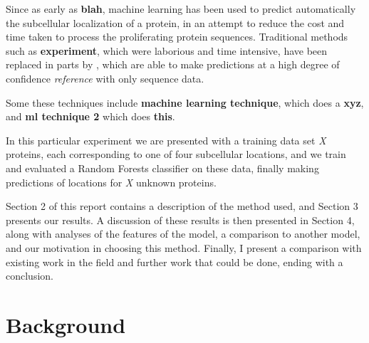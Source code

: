 \documentclass{bioinfo}
\begin{document}
Since as early as \textbf{blah}, machine learning has been used to predict automatically the subcellular localization of a protein, in an attempt to reduce the cost and time taken to process the proliferating protein sequences.   Traditional methods such as \textbf{experiment}, which were laborious and time intensive, have been replaced in parts by , which are able to make predictions at a high degree of confidence \textit{reference} with only sequence data.

Some these techniques include \textbf{machine learning technique}, which does a \textbf{xyz}, and \textbf{ml technique 2} which does \textbf{this}. 

In this particular experiment we are presented with a training data set \textit{X} proteins, each corresponding to one of four subcellular locations, and we train and evaluated a Random Forests classifier on these data, finally making predictions of locations for \textit{X} unknown proteins.  

Section 2 of this report contains a description of the method used, and Section 3 presents our results. A discussion of these results is then presented in Section 4, along with analyses of the features of the model, a comparison to another model, and our motivation in choosing this method.  Finally, I present a comparison with existing work in the field and further work that could be done, ending with a conclusion.




\section{Background}
\end{document}
